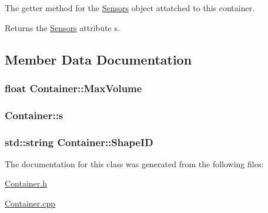 The getter method for the \hyperlink{classSensors}{Sensors} object attatched to this container. 

\begin{DoxyReturn}{Returns}
the \hyperlink{classSensors}{Sensors} attribute s. 
\end{DoxyReturn}


\subsection{Member Data Documentation}
\subsubsection[{\texorpdfstring{Max\+Volume}{MaxVolume}}]{\setlength{\rightskip}{0pt plus 5cm}float Container\+::\+Max\+Volume\hspace{0.3cm}{\ttfamily [protected]}}\hypertarget{classContainer_a31011c5bc823f6dc403a67617c04ef23}{}\label{classContainer_a31011c5bc823f6dc403a67617c04ef23}
\subsubsection[{\texorpdfstring{s}{s}}]{ Container\+::s\hspace{0.3cm}{\ttfamily [protected]}}\hypertarget{classContainer_a5f70d3b0713aff689d525e30ca1c9238}{}\label{classContainer_a5f70d3b0713aff689d525e30ca1c9238}
\subsubsection[{\texorpdfstring{Shape\+ID}{ShapeID}}]{\setlength{\rightskip}{0pt plus 5cm}std\+::string Container\+::\+Shape\+ID\hspace{0.3cm}{\ttfamily [protected]}}\hypertarget{classContainer_acf404f2619a77f41c70cc7a562381855}{}\label{classContainer_acf404f2619a77f41c70cc7a562381855}


The documentation for this class was generated from the following files\+:\begin{DoxyCompactItemize}
\item 
\hyperlink{Container_8h}{Container.\+h}\item 
\hyperlink{Container_8cpp}{Container.\+cpp}\end{DoxyCompactItemize}
